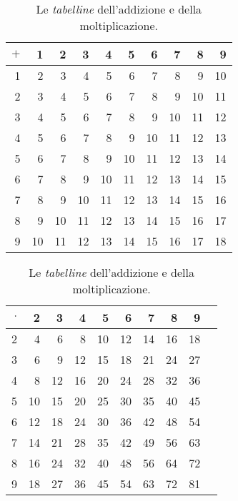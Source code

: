\begin{table}
  \begin{center}
    \def\tabcolsep{3pt}
    \begin{tabular}{>{\small}r|>{\small}r>{\small}r>{\small}r>{\small}r>{\small}r>{\small}r>{\small}r>{\small}r>{\small}r}
      $+$       & 1 & 2 & 3 & 4 & 5 & 6 & 7 & 8 & 9 \\ \hline
      1         & 2 & 3 & 4 & 5 & 6 & 7 & 8 & 9 & 10 \\
      2         & 3 & 4 & 5 & 6 & 7 & 8 & 9 & 10 & 11 \\
      3         & 4 & 5 & 6 & 7 & 8 & 9 & 10 & 11 & 12 \\
      4         & 5 & 6 & 7 & 8 & 9 & 10 & 11 & 12 & 13 \\
      5         & 6 & 7 & 8 & 9 & 10 & 11 & 12 & 13 & 14 \\
      6         & 7 & 8 & 9 & 10 & 11 & 12 & 13 & 14 & 15 \\
      7         & 8 & 9 & 10 & 11 & 12 & 13 & 14 & 15 & 16 \\
      8         & 9 & 10 & 11 & 12 & 13 & 14 & 15 & 16 & 17 \\
      9         & 10 & 11 & 12 & 13 & 14 & 15 & 16 & 17 & 18
      \end{tabular}
      \qquad
      \begin{tabular}{>{\small}r|r>{\small}r>{\small}r>{\small}r>{\small}r>{\small}r>{\small}r>{\small}r>{\small}r}
        $\cdot$       & 2 & 3 & 4 & 5 & 6 & 7 & 8 & 9 \\ \hline
        2         & 4 & 6 & 8 & 10 & 12 & 14 & 16 & 18 \\
        3         & 6 & 9 & 12 & 15 & 18 & 21 & 24 & 27 \\
        4         & 8 & 12 & 16 & 20 & 24 & 28 & 32 & 36 \\
        5         & 10 & 15 & 20 & 25 & 30 & 35 & 40 & 45 \\
        6         & 12 & 18 & 24 & 30 & 36 & 42 & 48 & 54 \\
        7         & 14 & 21 & 28 & 35 & 42 & 49 & 56 & 63 \\
        8         & 16 & 24 & 32 & 40 & 48 & 56 & 64 & 72 \\
        9         & 18 & 27 & 36 & 45 & 54 & 63 & 72 & 81
      \end{tabular}
    \end{center}
    \caption{Le \emph{tabelline} dell'addizione e della moltiplicazione.}
    \label{tab:tabelline}
\end{table}

